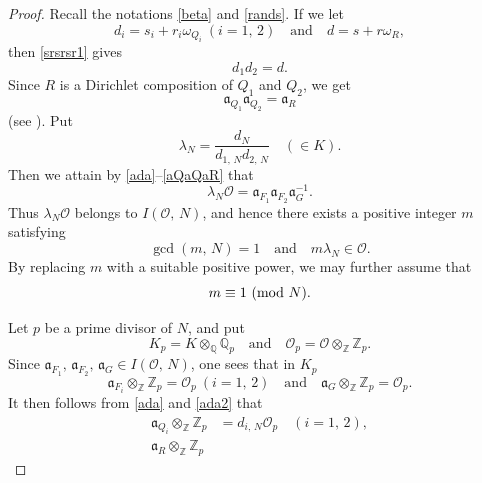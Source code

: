 \documentclass[reqno,11pt]{article}
\newcommand{\Mod}[1]{\ (\textup{mod}\ #1)}
\theoremstyle{plain} %
\theoremstyle{definition} %
\begin{document}
\begin{proof}
Recall the notations \eqref{beta} and \eqref{rands}. If we let
\begin{equation*}
d_i=s_i+r_i\omega_{Q_i}
~(i=1,\,2)\quad\textrm{and}\quad
d=s+r\omega_R,
\end{equation*}
then \eqref{srsrsr1} gives
\begin{equation}\label{ddd}
d_1d_2=d.
\end{equation}
Since $R$ is a Dirichlet composition of $Q_1$ and $Q_2$, 
we get
\begin{equation}\label{aQaQaR}
\mathfrak{a}_{Q_1}\mathfrak{a}_{Q_2}=\mathfrak{a}_R
\end{equation}
(see \cite[(7.13)]{Cox}). 
Put
\begin{equation*}
\lambda_N=\frac{d_N}{d_{1,\,N}d_{2,\,N}}\quad(\in K).
\end{equation*}
Then we attain by \eqref{ada}--\eqref{aQaQaR} that
\begin{equation}\label{lOaaa}
\lambda_N\mathcal{O}=\mathfrak{a}_{F_1}\mathfrak{a}_{F_2}\mathfrak{a}_G^{-1}.
\end{equation}
Thus $\lambda_N\mathcal{O}$ belongs to $I(\mathcal{O},\,N)$, and hence
there exists a positive integer $m$ satisfying
\begin{equation}\label{mlm1N}
\gcd(m,\,N)=1\quad\textrm{and}\quad m\lambda_N\in\mathcal{O}.
\end{equation}
By replacing $m$ with 
a suitable positive power, we may further assume that
\begin{equation}\label{mlm1N2}
m\equiv1\Mod{N}.
\end{equation}
\par
Let $p$ be a prime divisor of $N$, and put
\begin{equation*}
K_p=K\otimes_\mathbb{Q}\mathbb{Q}_p\quad\textrm{and}
\quad
\mathcal{O}_p=\mathcal{O}\otimes_{\mathbb{Z}}\mathbb{Z}_p.
\end{equation*}
Since $\mathfrak{a}_{F_1},\,\mathfrak{a}_{F_2},\,\mathfrak{a}_G\in
I(\mathcal{O},\,N)$, one sees that in $K_p$
\begin{equation*}
\mathfrak a_{F_i}\otimes_{\mathbb{Z}}\mathbb{Z}_p
=\mathcal{O}_p~(i=1,\,2)
\quad\textrm{and}\quad
\mathfrak{a}_G\otimes_{\mathbb{Z}}\mathbb{Z}_p
=\mathcal{O}_p.
\end{equation*}
It then follows from \eqref{ada} and \eqref{ada2} that
\begin{align}
\mathfrak{a}_{Q_i}\otimes_{\mathbb{Z}}\mathbb{Z}_p
&=d_{i,\,N}\mathcal{O}_p\quad(i=1,\,2),\label{aZdO}\\
\mathfrak{a}_R\otimes_{\mathbb{Z}}\mathbb{Z}_p

\end{align}
\end{proof}
\end{document}

